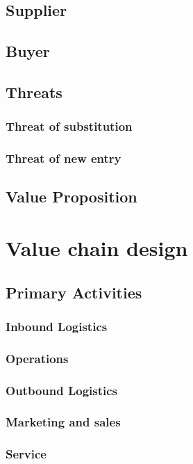 \documentclass{article}
\begin{document}
    \subsection{Supplier}

    \subsection{Buyer}

    \subsection{Threats}
    \subsubsection{Threat of substitution}
    \subsubsection{Threat of new entry}

    \subsection{Value Proposition}

  \newpage{}
  \section{Value chain design}
  \subsection{Primary Activities}
  \subsubsection{Inbound Logistics}
  \subsubsection{Operations}
  \subsubsection{Outbound Logistics}
  \subsubsection{Marketing and sales}
  \subsubsection{Service}
\end{document}
